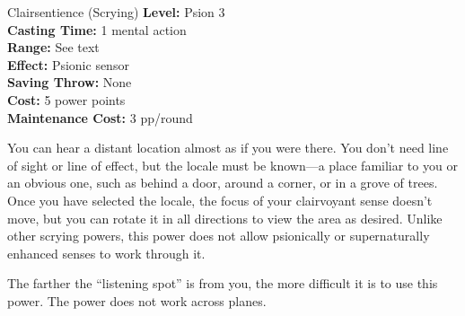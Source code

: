 {Clairsentience (Scrying)}
{
	\textbf{Level:}
	Psion 3\\
	\textbf{Casting Time:}
	1 mental action\\
	\textbf{Range:}
	See text\\
	\textbf{Effect:}
	Psionic sensor\\
	\textbf{Saving Throw:}
	None\\
	\textbf{Cost:}
	5 power points\\
	\textbf{Maintenance Cost:}
	3 pp/round\\
}
{
	You can hear a distant location almost as if you were there. You don’t need line of sight or line of effect, but the locale must be known---a place familiar to you or an obvious one, such as behind a door, around a corner, or in a grove of trees. Once you have selected the locale, the focus of your clairvoyant sense doesn’t move, but you can rotate it in all directions to view the area as desired. Unlike other scrying powers, this power does not allow psionically or supernaturally enhanced senses to work through it.

	The farther the ``listening spot'' is from you, the more difficult it is to use this power. The power does not work across planes.

}